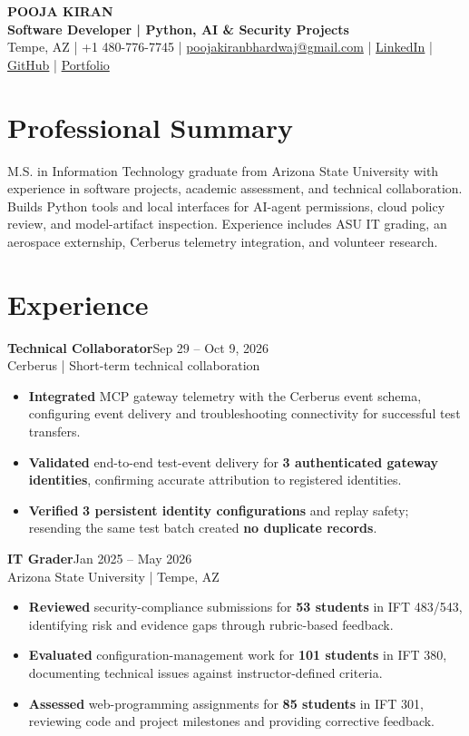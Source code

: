 \documentclass[letterpaper,10pt]{article}
\newcommand{\job}[3]{\noindent\textbf{#1}\hfill{\fontsize{10}{12}\selectfont #2}\\{\fontsize{10}{12}\selectfont #3}\vspace{1.5pt}}
\begin{document}
\fontsize{10.2}{12.0}\selectfont
\begin{center}
{\fontsize{19}{22}\selectfont\textbf{POOJA KIRAN}}\\[1pt]
{\fontsize{10.8}{12.8}\selectfont\textbf{Software Developer | Python, AI \& Security Projects}}\\[2pt]
{\fontsize{10}{12}\selectfont Tempe, AZ | +1 480-776-7745 | \href{mailto:poojakiranbhardwaj@gmail.com}{poojakiranbhardwaj@gmail.com} | \href{https://www.linkedin.com/in/poojakiran}{LinkedIn} | \href{https://github.com/poojakira}{GitHub} | \href{https://poojakira.github.io/Pooja_Kiran_Portfolio_Website/}{Portfolio}}
\end{center}\vspace{-2pt}

\section{Professional Summary}
M.S. in Information Technology graduate from Arizona State University with experience in software projects, academic assessment, and technical collaboration. Builds Python tools and local interfaces for AI-agent permissions, cloud policy review, and model-artifact inspection. Experience includes ASU IT grading, an aerospace externship, Cerberus telemetry integration, and volunteer research.

\section{Experience}
\job{Technical Collaborator}{Sep 29 -- Oct 9, 2026}{Cerberus | Short-term technical collaboration}
\begin{itemize}
\item \textbf{Integrated} MCP gateway telemetry with the Cerberus event schema, configuring event delivery and troubleshooting connectivity for successful test transfers.
\item \textbf{Validated} end-to-end test-event delivery for \textbf{3 authenticated gateway identities}, confirming accurate attribution to registered identities.
\item \textbf{Verified} \textbf{3 persistent identity configurations} and replay safety; resending the same test batch created \textbf{no duplicate records}.
\end{itemize}

\job{IT Grader}{Jan 2025 -- May 2026}{Arizona State University | Tempe, AZ}
\begin{itemize}
\item \textbf{Reviewed} security-compliance submissions for \textbf{53 students} in IFT 483/543, identifying risk and evidence gaps through rubric-based feedback.
\item \textbf{Evaluated} configuration-management work for \textbf{101 students} in IFT 380, documenting technical issues against instructor-defined criteria.
\item \textbf{Assessed} web-programming assignments for \textbf{85 students} in IFT 301, reviewing code and project milestones and providing corrective feedback.
\end{itemize}
\end{document}
